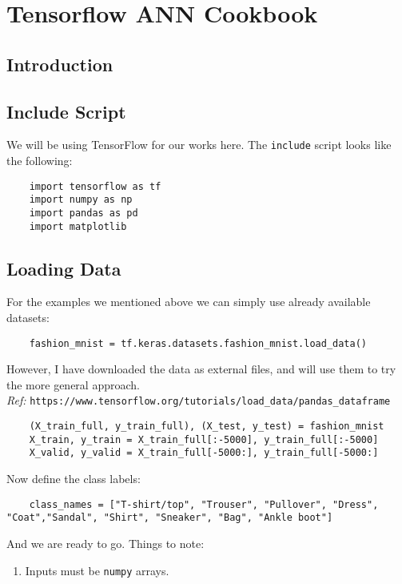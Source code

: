 \chapter{Tensorflow ANN Cookbook}

\section{Introduction}

\section{Include Script}
We will be using TensorFlow for our works here. The \verb|include| script looks like the following:
\begin{lstlisting}
    import tensorflow as tf
    import numpy as np
    import pandas as pd
    import matplotlib
\end{lstlisting}

\section{Loading Data}
For the examples we mentioned above we can simply use already available datasets:
\begin{lstlisting}
    fashion_mnist = tf.keras.datasets.fashion_mnist.load_data()
\end{lstlisting}
However, I have downloaded the data as external files, and will use them to try the more general approach.\\
\textit{Ref:} \verb|https://www.tensorflow.org/tutorials/load_data/pandas_dataframe|
\begin{lstlisting}
    (X_train_full, y_train_full), (X_test, y_test) = fashion_mnist
    X_train, y_train = X_train_full[:-5000], y_train_full[:-5000]
    X_valid, y_valid = X_train_full[-5000:], y_train_full[-5000:]
\end{lstlisting}
Now define the class labels:
\begin{lstlisting}
    class_names = ["T-shirt/top", "Trouser", "Pullover", "Dress", "Coat","Sandal", "Shirt", "Sneaker", "Bag", "Ankle boot"]
\end{lstlisting}
And we are ready to go. Things to note:
\begin{enumerate}
    \item Inputs must be \verb|numpy| arrays.
\end{enumerate}